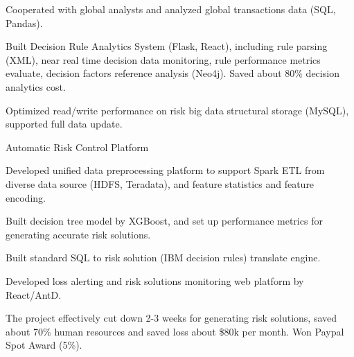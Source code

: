 \documentclass[11pt, a4paper, UTF8]{awesome-cv}
\begin{document}
\begin{cventries}
{\begin{cvitems}
        \item {Cooperated with global analysts and analyzed global transactions data (SQL, Pandas).}
        \item {Built Decision Rule Analytics System (Flask, React), including rule parsing (XML), near real time decision data monitoring, rule performance metrics evaluate, decision factors reference analysis (Neo4j). Saved about 80\% decision analytics cost.}
        \item {Optimized read/write performance on risk big data structural storage (MySQL), supported full data update.}
      \end{cvitems}
    }
    
  \cventry
    {Automatic Risk Control Platform} %
    {} %
    {} %
    {\ } %
    {
      \begin{cvitems} %
        \item {Developed unified data preprocessing platform to support Spark ETL from diverse data source (HDFS, Teradata), and feature statistics and feature encoding.}
        \item {Built decision tree model by XGBoost, and set up performance metrics for generating accurate risk solutions.}
        \item {Built standard SQL to risk solution (IBM decision rules) translate engine.}
        \item {Developed loss alerting and risk solutions monitoring web platform by React/AntD.}
        \item {The project effectively cut down 2-3 weeks for generating risk solutions, saved about 70\% human resources and saved loss about \$80k per month. Won Paypal Spot Award (5\%).}
      \end{cvitems}
    }


\end{cventries}
\end{document}
